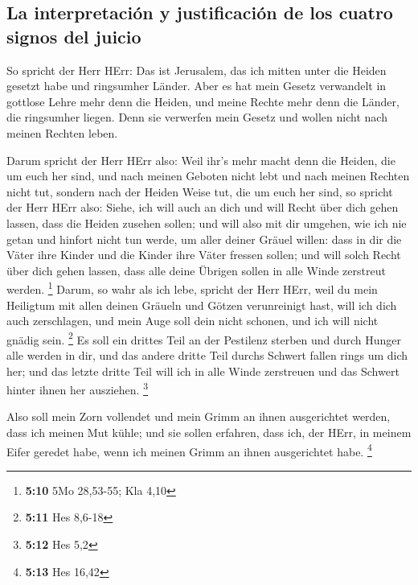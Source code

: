 \hypertarget{la-interpretaciuxf3n-y-justificaciuxf3n-de-los-cuatro-signos-del-juicio}{%
\subsection{La interpretación y justificación de los cuatro signos del
juicio}\label{la-interpretaciuxf3n-y-justificaciuxf3n-de-los-cuatro-signos-del-juicio}}

 So spricht der Herr HErr: Das ist Jerusalem, das ich
mitten unter die Heiden gesetzt habe und ringsumher Länder.
 Aber es hat mein Gesetz verwandelt in gottlose Lehre mehr
denn die Heiden, und meine Rechte mehr denn die Länder, die ringsumher
liegen. Denn sie verwerfen mein Gesetz und wollen nicht nach meinen
Rechten leben.

 Darum spricht der Herr HErr also: Weil ihr's mehr macht
denn die Heiden, die um euch her sind, und nach meinen Geboten nicht
lebt und nach meinen Rechten nicht tut, sondern nach der Heiden Weise
tut, die um euch her sind,  so spricht der Herr HErr also:
Siehe, ich will auch an dich und will Recht über dich gehen lassen, dass
die Heiden zusehen sollen;  und will also mit dir umgehen,
wie ich nie getan und hinfort nicht tun werde, um aller deiner Gräuel
willen:  dass in dir die Väter ihre Kinder und die Kinder
ihre Väter fressen sollen; und will solch Recht über dich gehen lassen,
dass alle deine Übrigen sollen in alle Winde zerstreut werden.
\footnote{\textbf{5:10} 5Mo 28,53-55; Kla 4,10}  Darum,
so wahr als ich lebe, spricht der Herr HErr, weil du mein Heiligtum mit
allen deinen Gräueln und Götzen verunreinigt hast, will ich dich auch
zerschlagen, und mein Auge soll dein nicht schonen, und ich will nicht
gnädig sein. \footnote{\textbf{5:11} Hes 8,6-18}  Es soll
ein drittes Teil an der Pestilenz sterben und durch Hunger alle werden
in dir, und das andere dritte Teil durchs Schwert fallen rings um dich
her; und das letzte dritte Teil will ich in alle Winde zerstreuen und
das Schwert hinter ihnen her ausziehen. \footnote{\textbf{5:12} Hes 5,2}

 Also soll mein Zorn vollendet und mein Grimm an ihnen
ausgerichtet werden, dass ich meinen Mut kühle; und sie sollen erfahren,
dass ich, der HErr, in meinem Eifer geredet habe, wenn ich meinen Grimm
an ihnen ausgerichtet habe. \footnote{\textbf{5:13} Hes 16,42}

